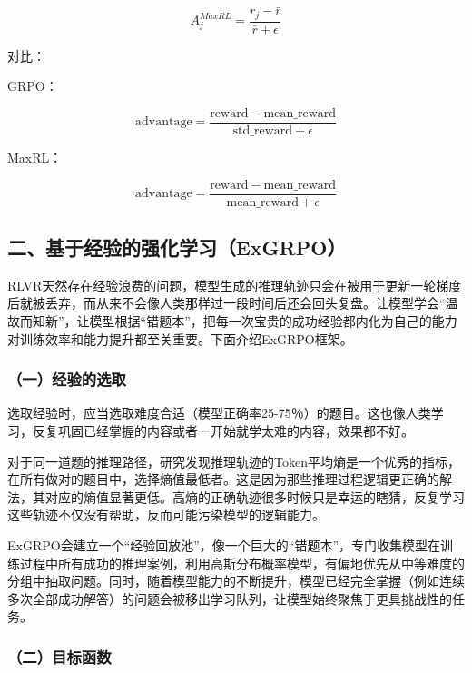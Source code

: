 \[
A_j^{MaxRL}=\frac{r_j-\bar{r}}{\bar{r}+\epsilon}
\]

对比：

GRPO：

\[
\mathrm{advantage}=\frac{\mathrm{reward}-\mathrm{mean\_reward}}{\mathrm{std\_reward}+\epsilon}
\]

MaxRL：

\[
\mathrm{advantage}=\frac{\mathrm{reward}-\mathrm{mean\_reward}}{\mathrm{mean\_reward}+\epsilon}
\]

\hypertarget{ux4e8cux57faux4e8eux7ecfux9a8cux7684ux5f3aux5316ux5b66ux4e60exgrpo}{%
\subsection{二、基于经验的强化学习（ExGRPO）}\label{ux4e8cux57faux4e8eux7ecfux9a8cux7684ux5f3aux5316ux5b66ux4e60exgrpo}}

RLVR天然存在经验浪费的问题，模型生成的推理轨迹只会在被用于更新一轮梯度后就被丢弃，而从来不会像人类那样过一段时间后还会回头复盘。让模型学会``温故而知新''，让模型根据``错题本''，把每一次宝贵的成功经验都内化为自己的能力对训练效率和能力提升都至关重要。下面介绍ExGRPO框架。

\hypertarget{ux4e00ux7ecfux9a8cux7684ux9009ux53d6}{%
\subsubsection{（一）经验的选取}\label{ux4e00ux7ecfux9a8cux7684ux9009ux53d6}}

选取经验时，应当选取难度合适（模型正确率25-75％）的题目。这也像人类学习，反复巩固已经掌握的内容或者一开始就学太难的内容，效果都不好。

对于同一道题的推理路径，研究发现推理轨迹的Token平均熵是一个优秀的指标，在所有做对的题目中，选择熵值最低者。这是因为那些推理过程逻辑更正确的解法，其对应的熵值显著更低。高熵的正确轨迹很多时候只是幸运的瞎猜，反复学习这些轨迹不仅没有帮助，反而可能污染模型的逻辑能力。

ExGRPO会建立一个``经验回放池''，像一个巨大的``错题本''，专门收集模型在训练过程中所有成功的推理案例，利用高斯分布概率模型，有偏地优先从中等难度的分组中抽取问题。同时，随着模型能力的不断提升，模型已经完全掌握（例如连续多次全部成功解答）的问题会被移出学习队列，让模型始终聚焦于更具挑战性的任务。

\hypertarget{ux4e8cux76eeux6807ux51fdux6570-2}{%
\subsubsection{（二）目标函数}\label{ux4e8cux76eeux6807ux51fdux6570-2}}

